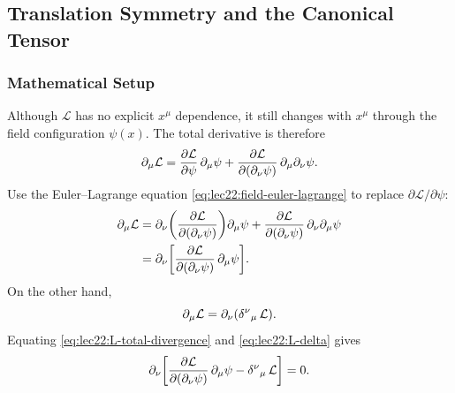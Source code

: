 \subsection{Translation Symmetry and the Canonical Tensor}
\label{subsec:lec22:canonical-tensor}

\subsubsection*{Mathematical Setup}
Although $\mathcal{L}$ has no explicit $x^\mu$ dependence, it still changes with
$x^\mu$ through the field configuration $\psi(x)$. The total derivative is therefore
\begin{equation}\label{eq:lec22:L-chain-rule}
  \partial_\mu\mathcal{L}
  =
  \pdv{\mathcal{L}}{\psi}\,\partial_\mu\psi
  +
  \pdv{\mathcal{L}}{(\partial_\nu\psi)}\,\partial_\mu\partial_\nu\psi.
\end{equation}
Use the Euler--Lagrange equation \eqref{eq:lec22:field-euler-lagrange} to replace
$\partial\mathcal{L}/\partial\psi$:
\begin{align}
  \partial_\mu\mathcal{L}
  &=
  \partial_\nu\qty(\pdv{\mathcal{L}}{(\partial_\nu\psi)})\partial_\mu\psi
  +
  \pdv{\mathcal{L}}{(\partial_\nu\psi)}\,\partial_\nu\partial_\mu\psi \notag\\
  &=
  \partial_\nu\qty[
    \pdv{\mathcal{L}}{(\partial_\nu\psi)}\,\partial_\mu\psi
  ].
  \label{eq:lec22:L-total-divergence}
\end{align}
On the other hand,
\begin{equation}\label{eq:lec22:L-delta}
  \partial_\mu\mathcal{L}
  = \partial_\nu\qty(\delta^\nu{}_\mu\,\mathcal{L}).
\end{equation}
Equating \eqref{eq:lec22:L-total-divergence} and \eqref{eq:lec22:L-delta} gives
\begin{equation}\label{eq:lec22:canonical-conservation-step}
  \partial_\nu\qty[
    \pdv{\mathcal{L}}{(\partial_\nu\psi)}\,\partial_\mu\psi
    -\delta^\nu{}_\mu\,\mathcal{L}
  ]=0.
\end{equation}


